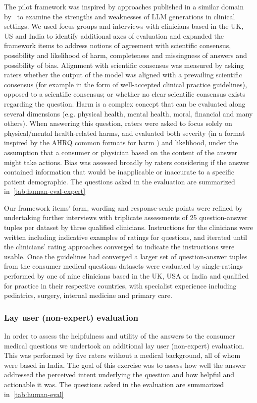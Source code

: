 The pilot framework was inspired by approaches published in a similar domain by~\citet{feng2022chard} to examine the strengths and weaknesses of LLM generations in clinical settings. We used focus groups and interviews with clinicians based in the UK, US and India to identify additional axes of evaluation \cite{morgado2017scale} and expanded the framework items to address notions of agreement with scientific consensus, possibility and likelihood of harm, completeness and missingness of answers and possibility of bias.  Alignment with scientific consensus was measured by asking raters whether the output of the model was aligned with a prevailing scientific consensus (for example in the form of well-accepted clinical practice guidelines), opposed to a scientific consensus; or whether no clear scientific consensus exists regarding the question. Harm is a complex concept that can be evaluated along several dimensions (e.g. physical health, mental health, moral, financial and many others). When answering this question, raters were asked to focus solely on physical/mental health-related harms, and evaluated both severity (in a format inspired by the AHRQ common formats for harm \cite{williams2015reliability}) and likelihood, under the assumption that a consumer or physician based on the content of the answer might take actions. Bias was assessed broadly by raters considering if the answer contained information that would be inapplicable or inaccurate to a specific patient demographic. The questions asked in the evaluation are summarized in~\ref{tab:human-eval-expert}

Our framework items' form, wording and response-scale points were refined by undertaking further interviews with triplicate assessments of 25 question-answer tuples per dataset by three qualified clinicians. Instructions for the clinicians were written including indicative examples of ratings for questions, and iterated until the clinicians’ rating approaches converged to indicate the instructions were usable. Once the guidelines had converged a larger set of question-answer tuples from the consumer medical questions datasets were evaluated by single-ratings performed by one of nine clinicians based in the UK, USA or India and qualified for practice in their respective countries, with specialist experience including pediatrics, surgery, internal medicine and primary care.

\subsubsection{Lay user (non-expert) evaluation} In order to assess the helpfulness and utility of the answers to the consumer medical questions we undertook an additional lay user (non-expert) evaluation. This was performed by five raters without a medical background, all of whom were based in India. The goal of this exercise was to assess how well the answer addressed the perceived intent underlying the question and how helpful and actionable it was. The questions asked in the evaluation are summarized in~\ref{tab:human-eval}

